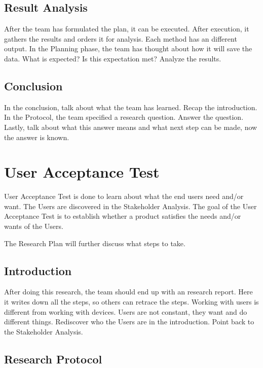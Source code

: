 \documentclass[10pt]{report}
\begin{document}
\subsection{Result Analysis}

After the team has formulated the plan, it can be executed. After execution, it gathers the results and orders it for analysis. Each method has an different output. In the Planning phase, the team has thought about how it will save the data. What is expected? Is this expectation met? Analyze the results.

\subsection{Conclusion}

In the conclusion, talk about what the team has learned. Recap the introduction. In the Protocol, the team specified a research question. Answer the question. Lastly, talk about what this answer means and what next step can be made, now the answer is known.

\newpage

\section{User Acceptance Test}

User Acceptance Test is done to learn about what the end users need and/or want. The Users are discovered in the Stakeholder Analysis. The goal of the User Acceptance Test is to establish whether a product satisfies the needs and/or wants of the Users.

The Research Plan will further discuss what steps to take.

\subsection{Introduction}

After doing this research, the team should end up with an research report. Here it writes down all the steps, so others can retrace the steps. Working with users is different from working with devices. Users are not constant, they want and do different things. Rediscover who the Users are in the introduction. Point back to the Stakeholder Analysis.

\subsection{Research Protocol}
\end{document}
